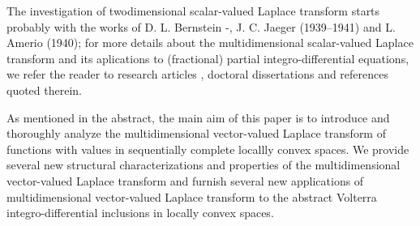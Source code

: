 \documentclass{amsart}
\theoremstyle{definition}
\theoremstyle{remark}
\numberwithin{equation}{section}
\begin{document}
The investigation of twodimensional scalar-valued Laplace transform starts probably with the works of D. L. Bernstein \cite{bern0}-\cite{bern}, J. C. Jaeger \cite{jager} (1939--1941) and L. Amerio \cite{amerio} (1940); for more details about the multidimensional scalar-valued Laplace transform and its aplications to (fractional) partial integro-differential equations, we refer the reader to  research articles \cite{iranac1,bern1,debnath,debnath1,elta,elta1,hant,lemn,rog,saa,sed}, doctoral dissertations \cite{ahmud,thesis0,thesis1} and references quoted therein. 

As mentioned in the abstract, the main aim of this paper is to introduce and thoroughly analyze the multidimensional vector-valued Laplace transform of functions with values in sequentially complete locallly convex spaces. We provide several new structural characterizations and  properties of the multidimensional vector-valued Laplace transform and furnish several new applications of multidimensional vector-valued Laplace transform to the abstract Volterra integro-differential inclusions in locally convex spaces.
\end{document}
